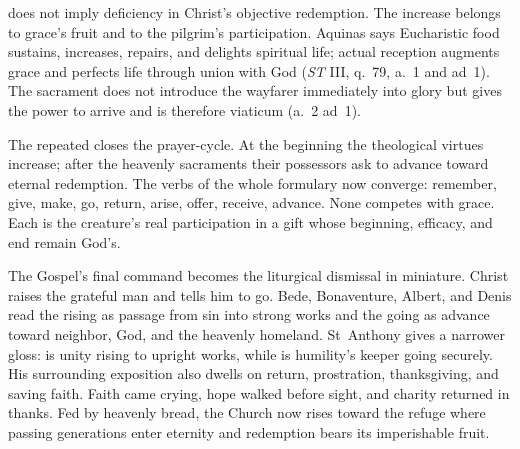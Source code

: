  does not imply deficiency in
Christ's objective redemption. The increase belongs to grace's fruit and to
the pilgrim's participation. Aquinas says Eucharistic food sustains, increases,
repairs, and delights spiritual life; actual reception augments grace and
perfects life through union with God (\emph{ST} III, q.~79, a.~1 and ad~1).
The sacrament does not introduce the wayfarer immediately into glory but gives
the power to arrive and is therefore viaticum (a.~2 ad~1).

The repeated  closes the prayer-cycle. At the beginning the
theological virtues increase; after the heavenly sacraments their possessors
ask to advance toward eternal redemption. The verbs of the whole formulary now
converge: remember, give, make, go, return, arise, offer, receive, advance. None
competes with grace. Each is the creature's real participation in a gift whose
beginning, efficacy, and end remain God's.

The Gospel's final command becomes the liturgical dismissal in miniature.
Christ raises the grateful man and tells him to go. Bede, Bonaventure, Albert,
and Denis read the rising as passage from sin into strong works and the going
as advance toward neighbor, God, and the heavenly homeland. St~Anthony gives a
narrower gloss:  is unity rising to upright works, while
 is humility's keeper going securely. His surrounding exposition
also dwells on return, prostration, thanksgiving, and saving faith.
Faith came crying, hope walked before sight, and charity returned in thanks.
Fed by heavenly bread, the Church now rises toward the refuge where passing
generations enter eternity and redemption bears its imperishable fruit.


